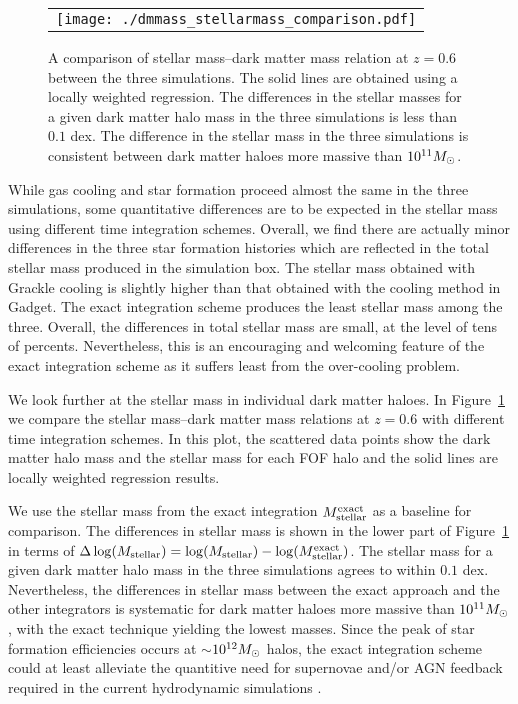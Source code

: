 \documentclass[a4paper,fleqn,usenatbib,useAMS, twocolumn]{mnras}
\newcommand{\Msun}{M_{\rm \odot}}
\begin{document}
\begin{figure}
\begin{center}
\begin{tabular}{c}
\texttt{[image: ./dmmass\_stellarmass\_comparison.pdf]}\\
\end{tabular}
\caption{\label{fig:mdm_mstar_comparison} A comparison of stellar mass--dark matter mass 
relation at $z = 0.6$ between the three simulations. The solid lines are obtained using 
a locally weighted regression. The differences in the  stellar masses for a given dark matter 
halo mass in the three simulations is less than $0.1$ dex. The difference in the stellar 
mass in the three simulations is consistent between dark matter haloes more massive 
than $10^{11} \Msun$.}
\end{center}
\end{figure}

While gas cooling and star formation proceed almost the same in the three simulations, 
some quantitative differences are to be expected in the stellar mass using different time integration 
schemes. Overall, we find there are actually minor differences in the three star formation histories 
which are reflected in the total stellar mass produced in the simulation box. The stellar mass obtained 
with {\sc Grackle} cooling is slightly higher than that obtained with the cooling method in 
{\sc Gadget}. The exact integration scheme produces the least stellar mass among the 
three. Overall, the differences in total stellar mass are small,
at the level of tens of percents.
Nevertheless, this is an encouraging and welcoming feature of the exact 
integration scheme as it suffers least from the over-cooling problem.

We look further at the stellar mass in individual dark matter haloes. In 
Figure~\ref{fig:mdm_mstar_comparison} 
we compare the stellar mass--dark matter mass relations at $z = 0.6$ with different time integration
schemes. In this plot, the scattered data points show the dark matter halo mass and the stellar mass for
each FOF halo and the solid lines are locally weighted regression results. 

We use the stellar mass from the exact integration $M_{\rm stellar}^{\rm exact}$ as 
a baseline for comparison. The differences in stellar mass is shown in the lower part of 
Figure~\ref{fig:mdm_mstar_comparison} in terms of
$\Delta \log(M_{\rm stellar}) = \log(M_{\rm stellar})  - \log(M_{\rm stellar}^{\rm exact})$. 
The stellar mass for a given dark matter halo mass in the three simulations 
agrees to within $0.1$ dex.  Nevertheless, the differences in
stellar mass between the exact approach and the other integrators is
systematic
for dark matter haloes more massive than $10^{11} \Msun$, with the exact
technique yielding the lowest masses. 
Since the peak of star formation efficiencies occurs at $\sim$$10^{12} \Msun$ 
halos, the exact integration scheme could at least alleviate the quantitive need for 
supernovae and/or AGN feedback required in the current hydrodynamic simulations 
\citep{Vogelsberger2013, Pillepich2017, Weinberger2017}.
\end{document}
